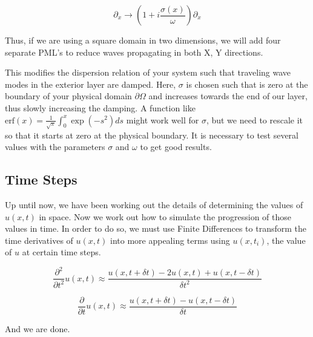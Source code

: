 \begin{equation}
\partial_x \rightarrow \left( 1 + i \frac{\sigma(x)}{\omega} \right) \partial_x
\end{equation}

Thus, if we are using a square domain in two dimensions, we will add four separate PML's to reduce waves propagating in both X, Y directions.

This modifies the dispersion relation of your system such that traveling wave modes in the exterior layer are damped. Here, $\sigma$ is chosen such that is zero at the boundary of your physical domain $\partial \Omega$ and increases towards the end of our layer, thus slowly increasing the damping. A function like $\text{erf}(x)=\frac{1}{\sqrt{\pi}}\int_0^x \exp(-s^2) ds$ might work well for $\sigma$, but we need to rescale it so that it starts at zero at the physical boundary. It is necessary to test several values with the parameters $\sigma$ and $\omega$ to get good results.

\subsection{Time Steps}

Up until now, we have been working out the details of determining the values of $u(x,t)$ in space. Now we work out how to simulate the progression of those values in time. In order to do so, we must use Finite Differences to transform the time derivatives of $u(x,t)$ into more appealing terms using $u(x,t_i)$, the value of $u$ at certain time steps. 

\begin{equation}
\frac{\partial^2}{\partial t^2} u(x,t) \approx \frac{u(x,t+\delta t) - 2 u(x,t) + u(x,t-\delta t)}{\delta t^2}
\end{equation}

\begin{equation}
\frac{\partial}{\partial t} u(x,t) \approx \frac{u(x,t+\delta t) - u(x,t-\delta t)}{\delta t}
\end{equation}




And we are done.













